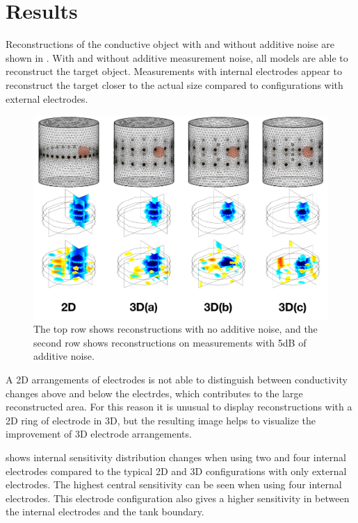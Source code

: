 \section{Results}

Reconstructions of the conductive object with and without additive noise are 
shown in . With and without additive measurement noise,
all models are able to reconstruct the target object. 
Measurements with internal electrodes appear to reconstruct the target 
closer to the actual size compared to configurations with external electrodes.

\begin{figure}
\centering
\includegraphics[width=\textwidth]{chapter6-internal_electrodes/imgs/Image_Comparison.pdf}
\caption[Internal electrode simulation reconstructions]{The top row shows reconstructions with no additive noise, and the second row shows reconstructions on measurements with 5dB of
additive noise.}
\label{fig:reconstruction_comparison}
\end{figure}

A 2D arrangements of electrodes is not able to distinguish between 
conductivity changes above and below the electrdes, which contributes to the large
reconstructed area. For this reason it is unusual to display reconstructions 
with a 2D ring of electrode in 3D, but the resulting image helps to visualize the
improvement of 3D electrode arrangements.

 shows internal sensitivity distribution changes when 
using two and four internal electrodes compared to the
typical 2D and 3D configurations with only external electrodes. 
The highest central sensitivity can be seen when using four internal 
electrodes. This electrode configuration also 
gives a higher sensitivity in between the internal electrodes
and the tank boundary.

